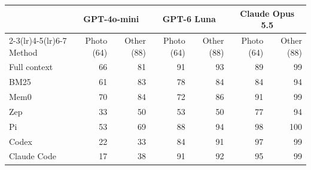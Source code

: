 \begin{tabular}{lrrrrrr}
\toprule
 & \multicolumn{2}{c}{GPT-4o-mini} & \multicolumn{2}{c}{GPT-6 Luna} & \multicolumn{2}{c}{Claude Opus 5.5} \\
\cmidrule(lr){2-3}\cmidrule(lr){4-5}\cmidrule(lr){6-7}
Method & Photo (64) & Other (88) & Photo (64) & Other (88) & Photo (64) & Other (88) \\
\midrule
Full context & 66 & 81 & 91 & 93 & 89 & 99 \\
BM25 & 61 & 83 & 78 & 84 & 84 & 94 \\
Mem0 & 70 & 84 & 72 & 86 & 91 & 99 \\
Zep & 33 & 50 & 53 & 50 & 77 & 94 \\
Pi & 53 & 69 & 88 & 94 & 98 & 100 \\
Codex & 22 & 33 & 84 & 91 & 97 & 99 \\
Claude Code & 17 & 38 & 91 & 92 & 95 & 99 \\
\bottomrule
\end{tabular}
